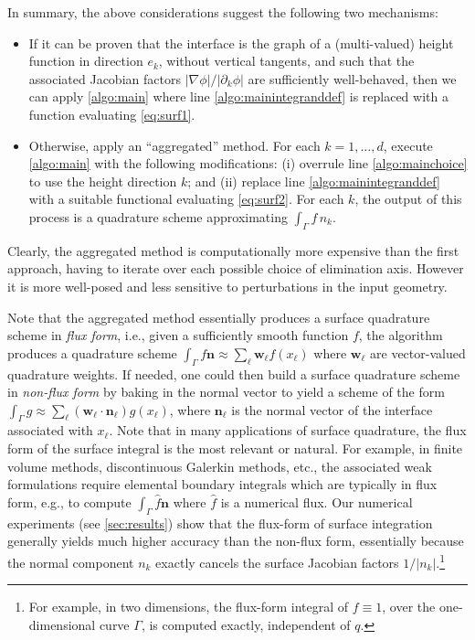 \documentclass[onefignum,onetabnum,onealgnum,oneeqnum]{siamart190516}
\begin{document}
In summary, the above considerations suggest the following two mechanisms: %
\begin{itemize}
\item If it can be proven that the interface is the graph of a (multi-valued) height function in direction $e_k$, without vertical tangents, and such that the associated Jacobian factors $|\nabla \phi|/|\partial_k \phi|$ are sufficiently well-behaved, then we can apply \cref{algo:main} where line \ref{algo:mainintegranddef} is replaced with a function evaluating \eqref{eq:surf1}.
\item Otherwise, apply an ``aggregated'' method. For each $k = 1, \ldots, d$, execute \cref{algo:main} with the following modifications: (i) overrule line \ref{algo:mainchoice} to use the height direction $k$; and (ii) replace line \ref{algo:mainintegranddef} with a suitable functional evaluating \eqref{eq:surf2}. For each $k$, the output of this process is a quadrature scheme approximating $\int_\Gamma f\,n_k$. 
\end{itemize}
Clearly, the aggregated method is computationally more expensive than the first approach, having to iterate over each possible choice of elimination axis. However it is more well-posed and less sensitive to perturbations in the input geometry.

Note that the aggregated method essentially produces a surface quadrature scheme in \textit{flux form}, i.e., given a sufficiently smooth function $f$, the algorithm produces a quadrature scheme $\int_\Gamma f \mathbf n \approx \sum_\ell {\mathbf w}_\ell f(x_\ell)$ where ${\mathbf w}_\ell$ are vector-valued quadrature weights. If needed, one could then build a surface quadrature scheme in \textit{non-flux form} by baking in the normal vector to yield a scheme of the form $\int_\Gamma g \approx \sum_\ell ({\mathbf w}_\ell \cdot {\mathbf n}_\ell) g(x_\ell)$, where ${\mathbf n}_\ell$ is the normal vector of the interface associated with $x_\ell$. %
%
Note that in many applications of surface quadrature, the flux form of the surface integral is the most relevant or natural. For example, in finite volume methods, discontinuous Galerkin methods, etc., the associated weak formulations require elemental boundary integrals which are typically in flux form, e.g., to compute $\int_\Gamma \hat f \mathbf n$ where $\hat f$ is a numerical flux. Our numerical experiments (see \cref{sec:results}) show that the flux-form of surface integration generally yields much higher accuracy than the non-flux form, essentially because the normal component $n_k$ exactly cancels the surface Jacobian factors $1/|n_k|$.\footnote{For example, in two dimensions, the flux-form integral of $f \equiv 1$, over the one-dimensional curve $\Gamma$, is computed exactly, independent of $q$.}
\end{document}
